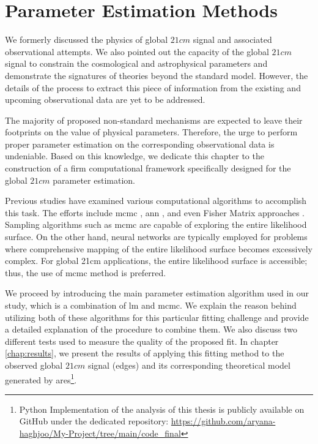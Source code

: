 \documentclass[12pt, TexShade, letterpaper]{report}
\begin{document}
\chapter{Parameter Estimation Methods}
\label{chap:method}
We formerly discussed the physics of global $21cm$ signal and associated observational attempts. We also pointed out the capacity of the global $21cm$ signal to constrain the cosmological and astrophysical parameters and demonstrate the signatures of theories beyond the standard model. However, the details of the process to extract this piece of information from the existing and upcoming observational data are yet to be addressed. \par
The majority of proposed non-standard mechanisms are expected to leave their footprints on the value of physical parameters. Therefore, the urge to perform proper parameter estimation on the corresponding observational data is undeniable. Based on this knowledge, we dedicate this chapter to the construction of a firm computational framework specifically designed for the global $21cm$ parameter estimation. \par
Previous studies have examined various computational algorithms to accomplish this task. The efforts include \gls{mcmc} \cite{pe_mcmc_1, pe_mcmc_2}, \gls{ann} \cite{pe_nn_1}, and even Fisher Matrix approaches \cite{pe_fisher_2}. Sampling algorithms such as \gls{mcmc} are capable of exploring the entire likelihood surface. On the other hand, neural networks are typically employed for problems where comprehensive mapping of the entire likelihood surface becomes excessively complex. For global 21cm applications, the entire likelihood surface is accessible; thus, the use of \gls{mcmc} method is preferred.\par
We proceed by introducing the main parameter estimation algorithm used in our study, which is a combination of \gls{lm} and \gls{mcmc}. We explain the reason behind utilizing both of these algorithms for this particular fitting challenge and provide a detailed explanation of the procedure to combine them. We also discuss two different tests used to measure the quality of the proposed fit. In chapter \ref{chap:results}, we present the results of applying this fitting method to the observed global $21cm$ signal (\gls{edges}) and its corresponding theoretical model generated by \gls{ares}\footnote{Python Implementation of the analysis of this thesis is publicly available on GitHub under the dedicated repository: 
\href{https://github.com/aryana-haghjoo/My-Project/tree/main/code_final}{https://github.com/aryana-haghjoo/My-Project/tree/main/code\_final}}.\par
\end{document}

